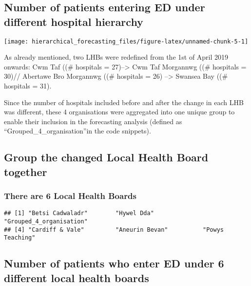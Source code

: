 \documentclass[
]{article}
\begin{document}
\hypertarget{number-of-patients-entering-ed-under-different-hospital-hierarchy}{%
\subsection{Number of patients entering ED under different hospital hierarchy}\label{number-of-patients-entering-ed-under-different-hospital-hierarchy}}

\texttt{[image: hierarchical\_forecasting\_files/figure-latex/unnamed-chunk-5-1]}

As already mentioned, two LHBs were redefined from the 1st of April 2019 onwards: Cwm Taf ((\# hospitals = 27)--\textgreater{} Cwm Taf Morgannwg ((\# hospitals = 30)// Abertawe Bro Morgannwg ((\# hospitals = 26) --\textgreater{} Swansea Bay ((\# hospitals = 31).

Since the number of hospitals included before and after the change in each LHB was different, these 4 organisations were aggregated into one unique group to enable their inclusion in the forecasting analysis (defined as ``Grouped\_4\_organisation''in the code snippets).

\newpage

\hypertarget{group-the-changed-local-health-board-together}{%
\subsection{Group the changed Local Health Board together}\label{group-the-changed-local-health-board-together}}

\hypertarget{there-are-6-local-health-boards}{%
\subsubsection{There are 6 Local Health Boards}\label{there-are-6-local-health-boards}}

\begin{verbatim}
## [1] "Betsi Cadwaladr"        "Hywel Dda"              "Grouped_4_organisation"
## [4] "Cardiff & Vale"         "Aneurin Bevan"          "Powys Teaching"
\end{verbatim}

\hypertarget{number-of-patients-who-enter-ed-under-6-different-local-health-boards}{%
\subsection{Number of patients who enter ED under 6 different local health boards}\label{number-of-patients-who-enter-ed-under-6-different-local-health-boards}}
\end{document}
